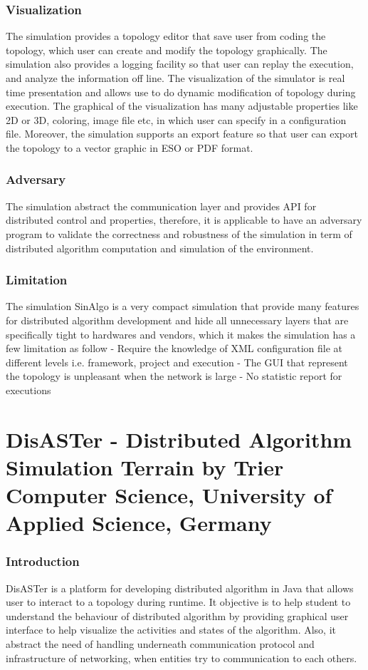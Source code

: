 \subsubsection{Visualization}
The simulation provides a topology editor that save user from coding the topology, which user can create and modify the topology graphically. The simulation also provides a logging facility so that user can replay the execution, and analyze the information off line. The visualization of the simulator is real time presentation and allows use to do dynamic modification of topology during execution. The graphical of the visualization has many adjustable properties like 2D or 3D, coloring, image file etc, in which user can specify in a configuration file. Moreover, the simulation supports an export feature so that user can export the topology to a vector graphic in ESO or PDF format.

\subsubsection{Adversary}
The simulation abstract the communication layer and provides API for distributed control and properties, therefore, it is applicable to have an adversary program to validate the correctness and robustness of the simulation in term of distributed algorithm computation and simulation of the environment.

\subsubsection{Limitation}
The simulation SinAlgo is a very compact simulation that provide many features for distributed algorithm development and hide all unnecessary layers that are specifically tight to hardwares and vendors, which it makes the simulation has a few limitation as follow
- Require the knowledge of XML configuration file at different levels i.e. framework, project and execution
- The GUI that represent the topology is unpleasant when the network is large
- No statistic report for executions


\section{DisASTer - Distributed Algorithm Simulation Terrain by Trier Computer Science, University of Applied Science, Germany}
\subsubsection{Introduction}
DisASTer is a platform for developing distributed algorithm in Java that allows user to interact to a topology during runtime. It objective is to help student to understand the behaviour of distributed algorithm by providing graphical user interface to help visualize the activities and states of the algorithm. Also, it abstract the need of handling underneath communication protocol and infrastructure of networking, when entities try to communication to each others.

